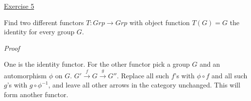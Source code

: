 \noindent
\underline{Exercise 5}
\vspace{2mm}

Find two different functors $T: Grp \rightarrow Grp$ with object function $T(G) = G$ the identity for every group $G$.

\vspace{2mm}

\noindent
\emph{Proof}

One is the identity functor. For the other functor pick a group $G$ and an automorphism $\phi$ on $G$. 
$G' \xrightarrow{f} G \xrightarrow{g} G''$. Replace all such $f$'s with $\phi \circ f$ and all such $g$'s with $g \circ \phi^{-1}$, and leave all other arrows in the category unchanged. This will form another functor.

\vspace{2mm}
